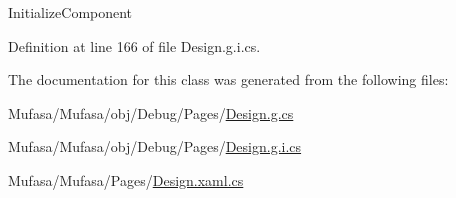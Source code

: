 Initialize\+Component 



Definition at line 166 of file Design.\+g.\+i.\+cs.



The documentation for this class was generated from the following files\+:\begin{DoxyCompactItemize}
\item 
Mufasa/\+Mufasa/obj/\+Debug/\+Pages/\hyperlink{_design_8g_8cs}{Design.\+g.\+cs}\item 
Mufasa/\+Mufasa/obj/\+Debug/\+Pages/\hyperlink{_design_8g_8i_8cs}{Design.\+g.\+i.\+cs}\item 
Mufasa/\+Mufasa/\+Pages/\hyperlink{_design_8xaml_8cs}{Design.\+xaml.\+cs}\end{DoxyCompactItemize}
